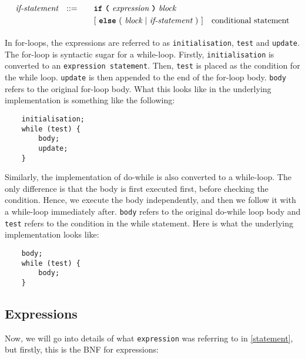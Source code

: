 \documentclass[a4paper]{article}
\begin{document}
\begin{alignat*}{9}
	&& \textit{if-statement} && ::= &\quad &&  \textbf{\texttt{if}}\
                                   \textbf{\texttt{(}}\ \textit{expression} \ \textbf{\texttt{)}}\ 
                                   \textit{block} \\
&&                       &&     &      && [ \ \textbf{\texttt{else}}\
                                          (\ \textit{block}
                                          \ | \
                                          \textit{if-statement} \ )\ ]
                                                            && \textrm{conditional statement} \\[1mm]
\end{alignat*}

In for-loops, the expressions are referred to as \texttt{initialisation}, \texttt{test} and \texttt{update}. The for-loop is syntactic sugar for a while-loop. Firstly, \texttt{initialisation} is converted to an \texttt{expression statement}. Then, \texttt{test} is placed as the condition for the while loop. \texttt{update} is then appended to the end of the for-loop body. \texttt{body} refers to the original for-loop body. What this looks like in the underlying implementation is something like the following:


\begin{verbatim}
	initialisation;
	while (test) {
		body;
		update;
	}
\end{verbatim}

Similarly, the implementation of do-while is also converted to a while-loop. The only difference is that the body is first executed first, before checking the condition. Hence, we execute the body independently, and then we follow it with a while-loop immediately after. \texttt{body} refers to the original do-while loop body and \texttt{test} refers to the condition in the while statement. Here is what the underlying implementation looks like:

\begin{verbatim}
	body;
	while (test) {
		body;
	}
\end{verbatim}

\subsection{Expressions}

Now, we will go into  details of what \texttt{expression} was referring to in \ref{statement}, but firstly, this is the BNF for expressions:
\end{document}
